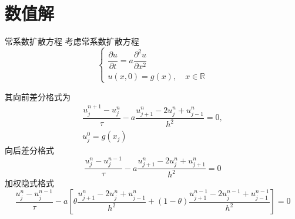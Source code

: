 \documentclass[xcolor=svgnames]{beamer} %
\begin{document}
\section{数值解}
\begin{frame}{常系数扩散方程}
 考虑常系数扩散方程
\begin{equation}\label{eq:04_cxsks_o}
\begin{cases}
 \dfrac{\partial u}{\partial t}=a\dfrac{\partial^2 u}{\partial x^2} \\
 u(x,0)=g(x),\quad x\in\mathbb{R}
\end{cases}
\end{equation}
\end{frame}
\begin{frame}
其向前差分格式为
\begin{gather}
 \dfrac{u_{j}^{n+1}-u_j^n}{\tau}-a\dfrac{u_{j+1}^n-2u_j^n+u_{j-1}^n}{h^2}=0,\label{eq:04_cxsks_xq}\\
 u_j^0 = g(x_j)
\end{gather}
向后差分格式
\begin{equation}\label{eq:04_cxsks_xh}
 \dfrac{u_j^n-u_j^{n-1}}{\tau}-a\dfrac{u_{j+1}^n-2u_j^n+u_{j+1}^n}{h^2}=0
\end{equation}
加权隐式格式
\begin{equation}\label{eq:04_cxsks_js}
 \dfrac{u_j^n-u_j^{n-1}}{\tau}-a\left[\theta\dfrac{u_{j+1}^n-2u_j^n+u_{j-1}^n}{h^2}
 +(1-\theta)\dfrac{u_{j+1}^{n-1}-2u_j^{n-1}+u_{j-1}^{n-1}}{h^2}\right]=0
\end{equation}
\end{frame}
\end{document}
